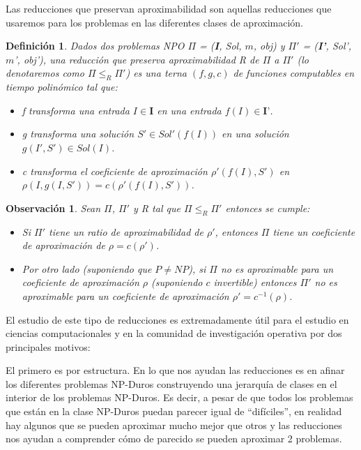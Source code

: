 \documentclass[a4paper,12pt,titlepage]{article}
\newtheorem{defi}{Definici\'on}[section]
\newtheorem{obs}{Observaci\'on}[section]
\begin{document}
Las reducciones que preservan aproximabilidad son aquellas reducciones que usaremos para los problemas en las diferentes clases de aproximaci\'on.

\begin{defi}

Dados dos problemas NPO $\Pi$ = (\textbf{I}, Sol, $m$, obj) y $\Pi'$ = (\textbf{I'}, Sol', $m$', obj'), una reducci\'on que preserva aproximabilidad R  de $\Pi$ a $\Pi'$ (lo denotaremos como $\Pi \leq_{R} \Pi'$) es una terna $(f, g, c)$ de funciones computables en tiempo polin\'omico tal que:

\begin{itemize}

\item f transforma una entrada $I\in\textbf{I}$ en una entrada $f(I)\in\textbf{I'}$.
\item g transforma una soluci\'on $S'\in Sol'(f(I))$ en una soluci\'on $g(I',S')\in Sol(I)$.
\item c transforma el coeficiente de aproximaci\'on $\rho'(f(I),S')$ en $\rho(I,g(I,S')) = c(\rho'(f(I),S')) $.

\end{itemize}

\end{defi}

\begin{obs}

Sean $\Pi$, $\Pi'$ y R tal que $\Pi \leq_{R} \Pi'$ entonces se cumple:

\begin{itemize}

\item Si $\Pi'$ tiene un ratio de aproximabilidad de $\rho'$, entonces $\Pi$ tiene un coeficiente de aproximaci\'on de $\rho = c(\rho')$.
\item Por otro lado (suponiendo que $P \neq NP$), si $\Pi$ no es aproximable para un coeficiente de aproximaci\'on $\rho$ (suponiendo $c$ invertible) entonces $\Pi'$ no es aproximable para un coeficiente de aproximaci\'on $\rho'=c^{-1}(\rho)$.

\end{itemize}

\end{obs}

El estudio de este tipo de reducciones es extremadamente \'util para el estudio en ciencias computacionales y en la comunidad de investigaci\'on operativa por dos principales motivos:

El primero es por estructura. En lo que nos ayudan las reducciones es en afinar los diferentes problemas NP-Duros construyendo una jerarqu\'ia de clases en el interior de los problemas NP-Duros. Es decir, a pesar de que todos los problemas que est\'an en la clase NP-Duros puedan parecer igual de ``dif\'iciles'', en realidad hay algunos que se pueden aproximar mucho mejor que otros y las reducciones nos ayudan a comprender c\'omo de parecido se pueden aproximar 2 problemas.
\end{document}
